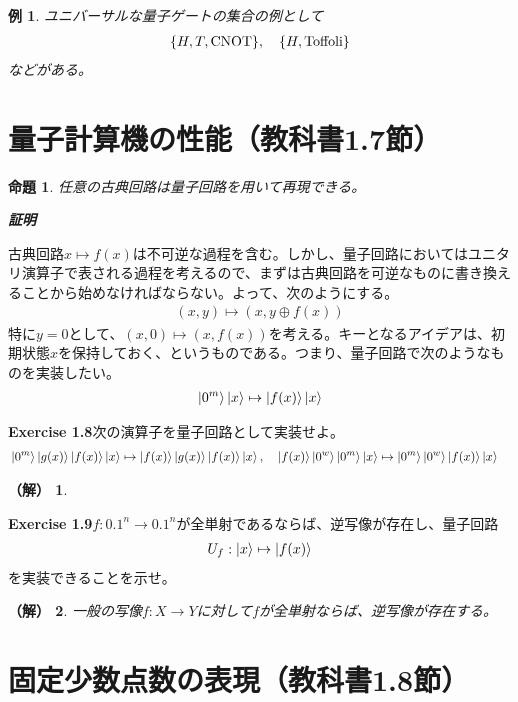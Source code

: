 \documentclass[dvipdfmx]{jarticle}
\makeatletter
\numberwithin{equation}{section}
\renewenvironment{proof}[1][\proofname]{\par
  \pushQED{\qed}
  \normalfont \topsep6\p@\@plus6\p@\relax
  \trivlist
  \item\relax
  {\itshape
  #1\@addpunct{ }}\hspace\labelsep\ignorespaces
}{
  \popQED\endtrivlist\@endpefalse
}
\theoremstyle{seminar}
\newtheorem{proposition}{命題}[section]
\newtheorem{example}{例}[section]
\newtheorem*{solution}{（解）}
\renewcommand{\proofname}{\textbf{証明}}
\makeatother
\begin{document}
\begin{example}
  ユニバーサルな量子ゲートの集合の例として
  \begin{align}
    \qty{H, T, \mathrm{CNOT}}, \quad \qty{H, \mathrm{Toffoli}}
  \end{align}
  などがある。
\end{example}

\section{量子計算機の性能（教科書1.7節）}
\begin{proposition}
  任意の古典回路は量子回路を用いて再現できる。
\end{proposition}

\begin{proof}
  古典回路$x \mapsto f(x)$は不可逆な過程を含む。しかし、量子回路においてはユニタリ演算子で表される過程を考えるので、まずは古典回路を可逆なものに書き換えることから始めなければならない。よって、次のようにする。
  \begin{align}
    (x, y) \mapsto (x, y \oplus f(x))
  \end{align}
  特に$y = 0$として、$(x, 0) \mapsto (x, f(x))$を考える。キーとなるアイデアは、初期状態$x$を保持しておく、というものである。つまり、量子回路で次のようなものを実装したい。
  \begin{align}
    \ket{0^m}\ket{x} \mapsto \ket{f(x)}\ket{x}
  \end{align}
\end{proof}

\begin{gray}
  {\bf Exercise 1.8}\hspace{1em}次の演算子を量子回路として実装せよ。
  \begin{align}
    &\ket{0^m} \ket{g(x)} \ket{f(x)} \ket{x} \mapsto \ket{f(x)} \ket{g(x)} \ket{f(x)} \ket{x}, \quad\ket{f(x)} \ket{0^w} \ket{0^m} \ket{x} \mapsto \ket{0^m} \ket{0^w} \ket{f(x)} \ket{x} \notag
  \end{align}
\end{gray}

\begin{solution}
  
\end{solution}

\begin{gray}
  {\bf Exercise 1.9}\hspace{1em}$f: \qty{0, 1}^n \rightarrow \qty{0, 1}^n$が全単射であるならば、逆写像が存在し、量子回路
  \begin{align}
    U_f : \ket{x} \mapsto \ket{f(x)} \notag
  \end{align}
  を実装できることを示せ。
\end{gray}

\begin{solution}
  一般の写像$f: X \rightarrow Y$に対して$f$が全単射ならば、逆写像が存在する。
\end{solution}

\section{固定少数点数の表現（教科書1.8節）}
\end{document}
